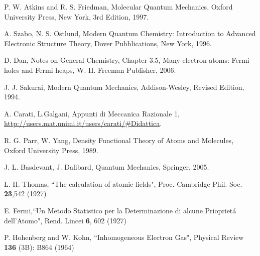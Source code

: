 \documentclass[a4paper,12pt]{article}
\begin{document}
\clearpage
{}
\begin{thebibliography}{9}


%
%

P. W. Atkins and R. S. Friedman,
Molecular Quantum Mechanics,
Oxford University Press, New York,
3rd Edition,
1997.

A. Szabo, N. S. Ostlund,
Modern Quantum Chemistry: Introduction to Advanced Electronic Structure Theory,
Dover Pubblications, New York,
1996.

D. Dan, Notes on General Chemistry,
Chapter 3.5, Many-electron atoms: Fermi holes and Fermi heaps,
W. H. Freeman Publisher,
2006.

J. J. Sakurai,
Modern Quantum Mechanics,
Addison-Wesley,
Revised Edition,
1994.

A. Carati, L.Galgani,
Appunti di Meccanica Razionale 1,
\url{http://users.mat.unimi.it/users/carati/#Didattica}.

R. G. Parr, W. Yang,
Density Functional Theory of Atoms and Molecules,
Oxford University Press,
1989.

J. L. Basdevant, J. Dalibard,
Quantum Mechanics,
Springer,
2005.


L. H. Thomas, ``The calculation of atomic fields", Proc. Cambridge Phil. Soc. \textbf{23},542 (1927)

E. Fermi,``Un Metodo Statistico per la Determinazione di alcune Priopriet\'a dell'Atomo", Rend. Lincei \textbf{6}, 602 (1927)

P. Hohenberg and W. Kohn, ``Inhomogeneous Electron Gas",  Physical Review \textbf{136} (3B): B864 (1964)


\end{thebibliography}
\end{document}
